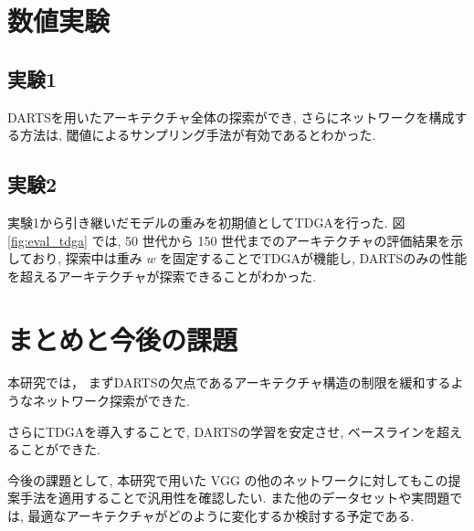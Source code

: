 \documentclass[a4paper,twoside,twocolumn,10pt]{article}
\begin{document}
\section{数値実験}
\subsection{実験1}
DARTSを用いたアーキテクチャ全体の探索ができ,
さらにネットワークを構成する方法は, 閾値によるサンプリング手法が有効であるとわかった.

\subsection{実験2}
実験1から引き継いだモデルの重みを初期値としてTDGAを行った.
図 \ref{fig:eval_tdga} では, 50 世代から 150 世代までのアーキテクチャの評価結果を示しており,
探索中は重み $w$ を固定することでTDGAが機能し,
DARTSのみの性能を超えるアーキテクチャが探索できることがわかった.



%

\section{まとめと今後の課題}
本研究では，
まずDARTSの欠点であるアーキテクチャ構造の制限を緩和するようなネットワーク探索ができた.


さらにTDGAを導入することで, DARTSの学習を安定させ, ベースラインを超えることができた.

今後の課題として,
本研究で用いた VGG の他のネットワークに対してもこの提案手法を適用することで汎用性を確認したい.
また他のデータセットや実問題では, 最適なアーキテクチャがどのように変化するか検討する予定である.




\end{document}
